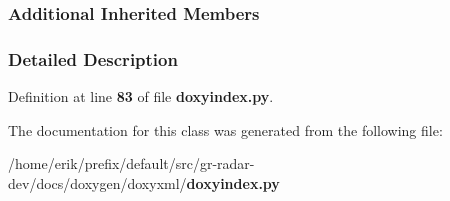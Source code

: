 \subsubsection*{Additional Inherited Members}


\subsubsection{Detailed Description}


Definition at line {\bf 83} of file {\bf doxyindex.\+py}.



The documentation for this class was generated from the following file\+:\begin{DoxyCompactItemize}
\item 
/home/erik/prefix/default/src/gr-\/radar-\/dev/docs/doxygen/doxyxml/{\bf doxyindex.\+py}\end{DoxyCompactItemize}

